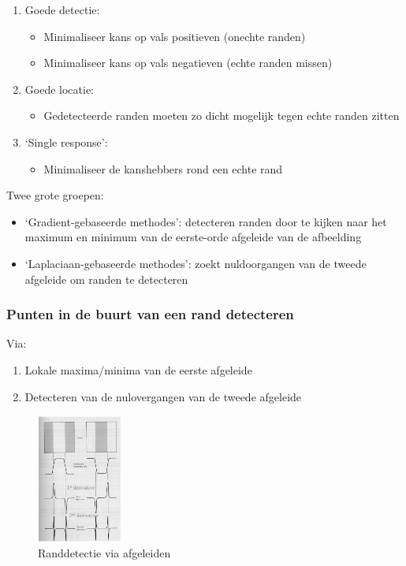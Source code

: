 \documentclass{article}
\begin{document}
\begin{enumerate}
    \item Goede detectie:
    \begin{itemize}
        \item Minimaliseer kans op vals positieven (onechte randen)
        \item Minimaliseer kans op vals negatieven (echte randen missen)
    \end{itemize}
    \item Goede locatie:
    \begin{itemize}
        \item Gedetecteerde randen moeten zo dicht mogelijk tegen echte randen zitten
    \end{itemize}
    \item `Single response':
    \begin{itemize}
        \item Minimaliseer de kanshebbers rond een echte rand
    \end{itemize}
\end{enumerate}

Twee grote groepen:

\begin{itemize}
    \item `Gradient-gebaseerde methodes': detecteren randen door te kijken naar het maximum en minimum van de eerste-orde afgeleide van de afbeelding
    \item `Laplaciaan-gebaseerde methodes': zoekt nuldoorgangen van de tweede afgeleide om randen te detecteren
\end{itemize}

\subsubsection{Punten in de buurt van een rand detecteren}

Via:

\begin{enumerate}
    \item Lokale maxima/minima van de eerste afgeleide
    \item Detecteren van de nulovergangen van de tweede afgeleide
\end{enumerate}

\begin{figure}[H]
    \centering
    \includegraphics[width=0.25\textwidth]{convolution-edgedetection3.png}
    \caption{Randdetectie via afgeleiden}
\end{figure}
\end{document}
